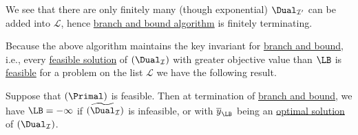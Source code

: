 \begin{remark}
	We see that there are only finitely many (though exponential) \(\Dual_{\mathcal{I} ^\prime}\) can be added into \(\mathcal{L} \), hence \hyperref[algo:branch-and-bound-algorithm]{branch and bound algorithm} is finitely terminating.
\end{remark}

Because the above algorithm maintains the key invariant for \hyperref[algo:branch-and-bound-algorithm]{branch and bound}, i.e., every \hyperref[def:feasible-solution]{feasible solution} of \((\Dual_{\mathcal{I} } )\) with greater objective value than \(\LB\) is \hyperref[def:feasible-solution]{feasible} for a problem on the list \(\mathcal{L} \) we have the following result.
\begin{theorem}\label{thm:lec23-1}
	Suppose that \((\Primal)\) is feasible. Then at termination of \hyperref[algo:branch-and-bound-algorithm]{branch and bound}, we have \(\LB=-\infty\) if \((\widetilde{\Dual} _\mathcal{I})\) is infeasible, or with \(\overline{y} _{\LB}\) being an \hyperref[def:optimal-solution]{optimal solution} of \((\Dual_{\mathcal{I} } )\).
\end{theorem}

